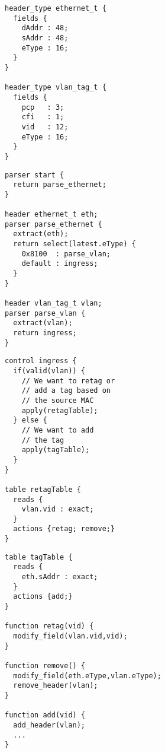 \begin{minipage}[t]{0.48\textwidth}
\begin{verbatim}
header_type ethernet_t {
  fields {
    dAddr : 48; 
    sAddr : 48; 
    eType : 16; 
  }   
}

header_type vlan_tag_t {
  fields {
    pcp   : 3;
    cfi   : 1;
    vid   : 12; 
    eType : 16; 
  }   
}
\end{verbatim}
\end{minipage} 
%
\begin{minipage}[t]{0.48\textwidth}
\begin{verbatim}
parser start {
  return parse_ethernet;
}

header ethernet_t eth;
parser parse_ethernet {
  extract(eth);
  return select(latest.eType) {
    0x8100  : parse_vlan;
    default : ingress;
  }   
}

header vlan_tag_t vlan;
parser parse_vlan {
  extract(vlan);
  return ingress;
}   
\end{verbatim}
\end{minipage}

\pagebreak

\begin{minipage}[t]{0.48\textwidth}
\begin{verbatim}
control ingress {
  if(valid(vlan)) {
    // We want to retag or
    // add a tag based on
    // the source MAC
    apply(retagTable);
  } else {
    // We want to add
    // the tag
    apply(tagTable);
  }
}

table retagTable {
  reads {
    vlan.vid : exact;
  }
  actions {retag; remove;}
}
\end{verbatim}
\end{minipage}
\begin{minipage}[t]{0.48\textwidth}
\begin{verbatim}
table tagTable {
  reads {
    eth.sAddr : exact;
  }
  actions {add;}
}
 
function retag(vid) {
  modify_field(vlan.vid,vid);
}

function remove() {
  modify_field(eth.eType,vlan.eType);
  remove_header(vlan);
}

function add(vid) {
  add_header(vlan);
  ...
}
    \end{verbatim}
\end{minipage} 
